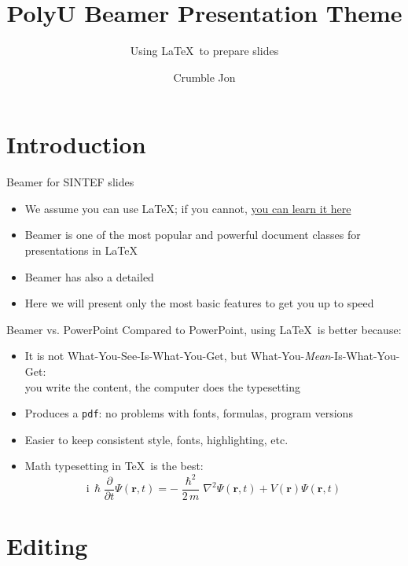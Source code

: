 \documentclass[10pt,aspectratio=169]{beamer}
\title{PolyU Beamer Presentation Theme}
\subtitle{Using \LaTeX\ to prepare slides}
\author{Crumble Jon}
\begin{document}
\maketitle

\section{Introduction}

\begin{frame}{Beamer for SINTEF slides}{\thesection \, \secname}
\begin{itemize}
\item We assume you can use \LaTeX; if you cannot,
\href{http://en.wikibooks.org/wiki/LaTeX/}{you can learn it here}
\item Beamer is one of the most popular and powerful document
classes for presentations in \LaTeX
\item Beamer has also a detailed
\item Here we will present only the most basic features to get you up to speed
\end{itemize}
\end{frame}

\begin{frame}{Beamer vs. PowerPoint}
Compared to PowerPoint, using \LaTeX\ is better because:
\begin{itemize}
\item It is not What-You-See-Is-What-You-Get, but
What-You-\emph{Mean}-Is-What-You-Get:\\
you write the content, the computer does the typesetting
\item Produces a \texttt{pdf}: no problems with fonts, formulas,
      program versions
\item Easier to keep consistent style, fonts, highlighting, etc.
\item Math typesetting in \TeX\ is the best:
\begin{equation*}
\mathrm{i}\,\hslash\frac{\partial}{\partial t} \Psi(\mathbf{r},t) =
-\frac{\hslash^2}{2\,m}\nabla^2\Psi(\mathbf{r},t)
+ V(\mathbf{r})\Psi(\mathbf{r},t)
\end{equation*}

\end{itemize}
\end{frame}

\section{Editing}
\end{document}
